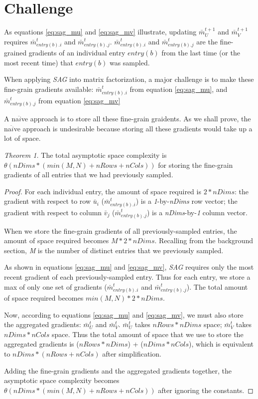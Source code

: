 \section{Challenge}
As equations \ref{eq:sag_mu} and \ref{eq:sag_mv} illustrate, updating $\bar{m}_{U}^{t+1}$ and $\bar{m}_{V}^{t+1}$ requires $\bar{m}_{entry(b).i}^{t}$ and $\bar{m}_{entry(b).j}^{t}$.  
$\bar{m}_{entry(b).i}^{t}$ and $\bar{m}_{entry(b).j}^{t}$ are the fine-grained gradients of an individual entry $entry(b)$ from the last time (or the most recent time) that $entry(b)$ was sampled.  

When applying \emph{SAG} into matrix factorization, a major challenge is to make these fine-grain gradients available: 
$\bar{m}_{entry(b).i}^{t}$ from equation \ref{eq:sag_mu}, and 
$\bar{m}_{entry(b).j}^{t}$ from equation \ref{eq:sag_mv}  

A na$\ddot{i}$ve approach is to store all these fine-grain graidents.  
As we shall prove, the na$\ddot{i}$ve approach is undesirable because storing all these gradients would take up a lot of space.  

\emph{Theorem 1.} 
The total asymptotic space complexity is $\theta(nDims*(min(M,N)+nRows+nCols))$ for storing the fine-grain gradients of all entries that we had previously sampled.  
\begin{proof}
For each individual entry, the amount of space required is $2*nDims$:  
the gradient with respect to row $\bar{u}_i$ ($\bar{m}_{entry(b).i}^{t}$) is a \emph{1}-by-\emph{nDims} row vector;  
the gradient with respect to column $\bar{v}_j$ ($\bar{m}_{entry(b).j}^{t}$) is a \emph{nDims}-by-\emph{1} column vector.  

When we store the fine-grain gradients of all previously-sampled entries, the amount of space required becomes $M*2*nDims$.  
Recalling from the background section, \emph{M} is the number of distinct entries that we previously sampled.  

As shown in equations \ref{eq:sag_mu} and \ref{eq:sag_mv}, \emph{SAG} requires only the most recent gradient of each previously-sampled entry.
Thus for each entry, we store a max of only one set of gradients ($\bar{m}_{entry(b).i}^{t}$ and $\bar{m}_{entry(b).j}^{t}$).
The total amount of space required becomes $min(M,N)*2*nDims$.

Now, according to equations \ref{eq:sag_mu} and \ref{eq:sag_mv}, we must also store the aggregated gradients: $\bar{m}_{U}^{t}$ and $\bar{m}_{V}^{t}$.  
$\bar{m}_{U}^{t}$ takes $nRows*nDims$ space; $\bar{m}_{V}^{t}$ takes $nDims*nCols$ space.  
Thus the total amount of space that we use to store the aggregated gradients is ($nRows*nDims$) + ($nDims*nCols$), which is equivalent to $nDims*(nRows+nCols)$ after simplification. 

Adding the fine-grain gradients and the aggregated gradients together, the asymptotic space complexity becomes $\theta(nDims*(min(M,N)+nRows+nCols))$ after ignoring the constants.  
\end{proof}



